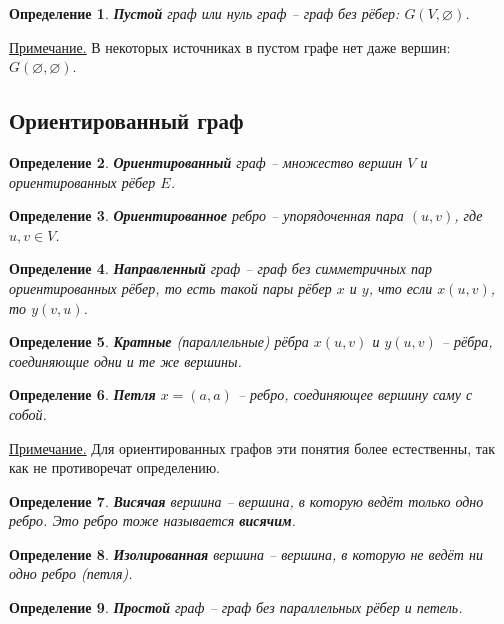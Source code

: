 \documentclass[a4paper,12pt]{article}
\newtheorem*{defin}{Определение}
\begin{document}
\begin{defin}
    \textbf{Пустой} граф или нуль граф -- граф без рёбер: $G(V, \varnothing)$.
\end{defin}

\underline{Примечание.} В некоторых источниках в пустом графе нет даже вершин: $G(\varnothing, \varnothing)$.

\subsection*{Ориентированный граф}

\begin{defin}
    \textbf{Ориентированный} граф -- множество вершин $V$ и ориентированных рёбер $E$.
\end{defin}

\begin{defin}
    \textbf{Ориентированное} ребро -- упорядоченная пара $(u, v)$, где $u, v \in V$.
\end{defin}

\begin{defin}
    \textbf{Направленный} граф -- граф без симметричных пар ориентированных рёбер, то есть такой пары рёбер $x$ и $y$, что если $x(u, v)$, то $y(v, u)$.
\end{defin}

\begin{defin}
    \textbf{Кратные} (параллельные) рёбра $x(u, v)$ и $y(u, v)$ -- рёбра, соединяющие одни и те же вершины.
\end{defin}

\begin{defin}
    \textbf{Петля} $x = (a, a)$ -- ребро, соединяющее вершину саму с собой.
\end{defin}

\underline{Примечание.} Для ориентированных графов эти понятия более естественны, так как не противоречат определению.

\begin{defin}
    \textbf{Висячая} вершина -- вершина, в которую ведёт только одно ребро. Это ребро тоже называется \textbf{висячим}.
\end{defin}

\begin{defin}
    \textbf{Изолированная} вершина -- вершина, в которую не ведёт ни одно ребро (петля).
\end{defin}

\begin{defin}
    \textbf{Простой} граф -- граф без параллельных рёбер и петель.
\end{defin}
\end{document}
